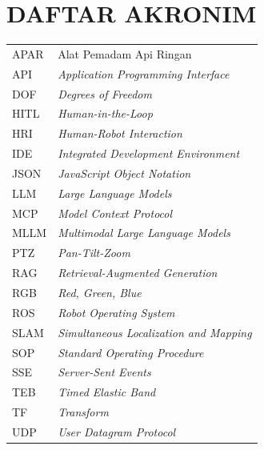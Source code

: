 \chapter*{DAFTAR AKRONIM}

\begin{tabular}{ll}
APAR & Alat Pemadam Api Ringan \\
API & \textit{Application Programming Interface} \\
DOF & \textit{Degrees of Freedom} \\
HITL & \textit{Human-in-the-Loop} \\
HRI & \textit{Human-Robot Interaction} \\
IDE & \textit{Integrated Development Environment} \\
JSON & \textit{JavaScript Object Notation} \\
LLM & \textit{Large Language Models} \\
MCP & \textit{Model Context Protocol} \\
MLLM & \textit{Multimodal Large Language Models} \\
PTZ & \textit{Pan-Tilt-Zoom} \\
RAG & \textit{Retrieval-Augmented Generation} \\
RGB & \textit{Red, Green, Blue} \\
ROS & \textit{Robot Operating System} \\
SLAM & \textit{Simultaneous Localization and Mapping} \\
SOP & \textit{Standard Operating Procedure} \\
SSE & \textit{Server-Sent Events} \\
TEB & \textit{Timed Elastic Band} \\
TF & \textit{Transform} \\
UDP & \textit{User Datagram Protocol} \\
\end{tabular}
